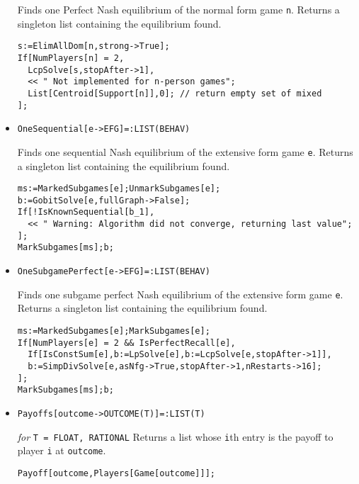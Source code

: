 \begin{itemize}
\bd 
Finds one Perfect Nash equilibrium of the normal form game
\verb+n+.  Returns a singleton list containing the equilibrium found.

\begin{verbatim}
s:=ElimAllDom[n,strong->True];
If[NumPlayers[n] = 2, 
  LcpSolve[s,stopAfter->1],
  << " Not implemented for n-person games";
  List[Centroid[Support[n]],0]; // return empty set of mixed
];
\end{verbatim} 
\ed

\item{}
\protect \large \begin{verbatim}
OneSequential[e->EFG]=:LIST(BEHAV)
\end{verbatim}\normalsize

\bd 
Finds one sequential Nash equilibrium of the extensive form game
\verb+e+.  Returns a singleton list containing the equilibrium found.

\begin{verbatim}
ms:=MarkedSubgames[e];UnmarkSubgames[e];
b:=GobitSolve[e,fullGraph->False];
If[!IsKnownSequential[b_1],
  << " Warning: Algorithm did not converge, returning last value";
];
MarkSubgames[ms];b;
\end{verbatim} 
\ed

\item{}
\protect \large \begin{verbatim}
OneSubgamePerfect[e->EFG]=:LIST(BEHAV)
\end{verbatim}\normalsize

\bd 
Finds one subgame perfect Nash equilibrium of the extensive form
game \verb+e+.  Returns a singleton list containing the equilibrium
found.

\begin{verbatim}
ms:=MarkedSubgames[e];MarkSubgames[e];
If[NumPlayers[e] = 2 && IsPerfectRecall[e],
  If[IsConstSum[e],b:=LpSolve[e],b:=LcpSolve[e,stopAfter->1]],
  b:=SimpDivSolve[e,asNfg->True,stopAfter->1,nRestarts->16];
];
MarkSubgames[ms];b;
\end{verbatim} 
\ed

\item{}
\protect \large \begin{verbatim}
Payoffs[outcome->OUTCOME(T)]=:LIST(T)
\end{verbatim}\normalsize

{\it for} {\tt T = FLOAT, RATIONAL}
\bd 
Returns a list whose \verb+i+th entry is the payoff to player \verb+i+
at \verb+outcome+.
\begin{verbatim}
Payoff[outcome,Players[Game[outcome]]];
\end{verbatim} 
\ed


\end{itemize}
